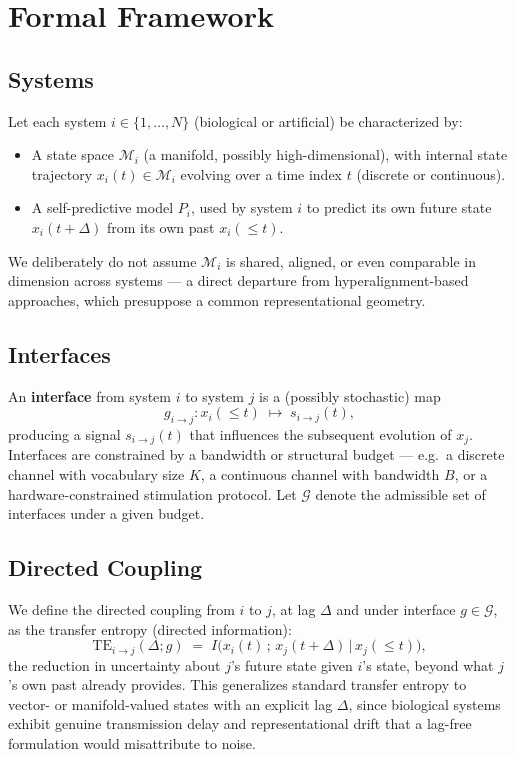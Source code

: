 \documentclass[11pt]{article}
\begin{document}
\section{Formal Framework}
\label{sec:theory}

\subsection{Systems}
Let each system $i \in \{1, \dots, N\}$ (biological or artificial) be characterized by:
\begin{itemize}[leftmargin=1.2em]
    \item A state space $\mathcal{M}_i$ (a manifold, possibly high-dimensional), with internal state trajectory $x_i(t) \in \mathcal{M}_i$ evolving over a time index $t$ (discrete or continuous).
    \item A self-predictive model $P_i$, used by system $i$ to predict its own future state $x_i(t+\Delta)$ from its own past $x_i(\le t)$.
\end{itemize}
We deliberately do not assume $\mathcal{M}_i$ is shared, aligned, or even comparable in dimension across systems --- a direct departure from hyperalignment-based approaches, which presuppose a common representational geometry.

\subsection{Interfaces}
An \textbf{interface} from system $i$ to system $j$ is a (possibly stochastic) map
\[
g_{i \to j} : x_i(\le t) \;\longmapsto\; s_{i \to j}(t),
\]
producing a signal $s_{i \to j}(t)$ that influences the subsequent evolution of $x_j$. Interfaces are constrained by a bandwidth or structural budget --- e.g.\ a discrete channel with vocabulary size $K$, a continuous channel with bandwidth $B$, or a hardware-constrained stimulation protocol. Let $\mathcal{G}$ denote the admissible set of interfaces under a given budget.

\subsection{Directed Coupling}
We define the directed coupling from $i$ to $j$, at lag $\Delta$ and under interface $g \in \mathcal{G}$, as the transfer entropy (directed information):
\begin{equation}
\mathrm{TE}_{i \to j}(\Delta; g) \;=\; I\big(x_i(t)\, ;\, x_j(t+\Delta) \,\big|\, x_j(\le t)\big),
\end{equation}
the reduction in uncertainty about $j$'s future state given $i$'s state, beyond what $j$'s own past already provides. This generalizes standard transfer entropy to vector- or manifold-valued states with an explicit lag $\Delta$, since biological systems exhibit genuine transmission delay and representational drift that a lag-free formulation would misattribute to noise.
\end{document}
